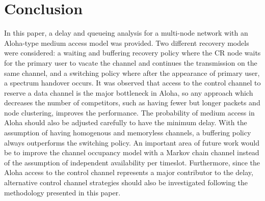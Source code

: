 \documentclass[12pt,journal,oneside,onecolumn]{IEEEtran}
\begin{document}
\section{Conclusion}
\label{sec:conclusion}
In this paper, a delay and queueing analysis for a multi-node network with an 
Aloha-type medium access model was provided. Two different recovery models 
were considered: a waiting and buffering recovery policy where the CR node 
waits for the primary user to vacate the channel and continues the transmission 
on the same channel, and a switching policy where after the appearance of 
primary user, a spectrum handover occurs. It was observed that access to 
the control channel to reserve a data channel is the major bottleneck in Aloha, 
so any approach which decreases the number of competitors, 
such as having fewer but longer packets and node clustering, improves the performance. 
The probability of medium access in Aloha should also be adjusted carefully
to have the minimum delay. With the assumption of having homogenous and 
memoryless channels, a buffering policy always outperforms the switching policy. 
An important area of future work would be to improve the channel occupancy model with a 
Markov chain channel instead of the assumption of independent 
availability per timeslot. Furthermore, since the Aloha access to the control channel represents
a major contributor to the delay, alternative control channel strategies should also be investigated following 
the methodology presented in this paper.



\end{document}

